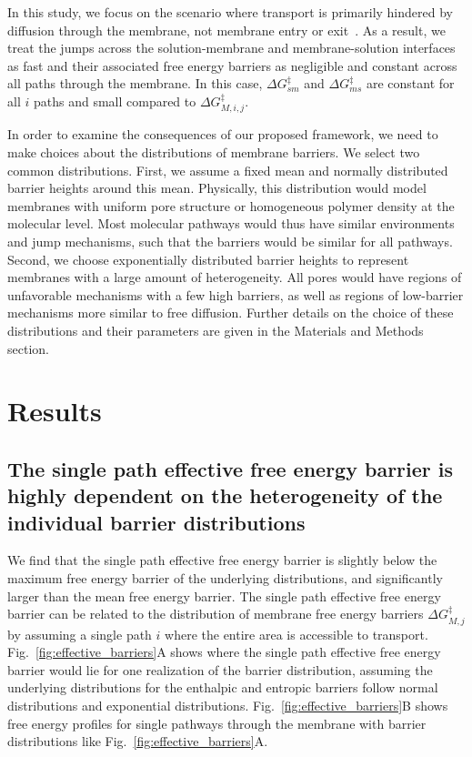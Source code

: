 \documentclass[12pt]{article}
\begin{document}
In this study, we focus on the scenario where transport is primarily hindered by diffusion through the membrane, not membrane entry or exit~\cite{zhou_intrapore_2020,song_molecular_2020}. As a result, we treat the jumps across the solution-membrane and membrane-solution interfaces as fast and their associated free energy barriers as negligible and constant across all paths through the membrane. In this case, $\Delta G_{sm}^{\ddagger}$ and $\Delta G_{ms}^{\ddagger}$ are constant for all $i$  paths and small compared to $\Delta G_{M,i,j}^{\ddagger}$. 

In order to examine the consequences of our proposed framework, we need to make choices about the distributions of membrane barriers. We select two common distributions. First, we assume a fixed mean and normally distributed barrier heights around this mean. Physically, this distribution would model membranes with uniform pore structure or homogeneous polymer density at the molecular level. Most molecular pathways would thus have similar environments and jump mechanisms, such that the barriers would be similar for all pathways. Second, we choose exponentially distributed barrier heights to represent membranes with a large amount of heterogeneity. All pores would have regions of unfavorable mechanisms with a few high barriers, as well as regions of low-barrier mechanisms more similar to free diffusion. Further details on the choice of these distributions and their parameters are given in the Materials and Methods section.

\section*{Results}
\subsection*{The single path effective free energy barrier is highly dependent on the heterogeneity of the individual barrier distributions}

We find that the single path effective free energy barrier is slightly below the maximum free energy barrier of the underlying distributions, and significantly larger than the mean free energy barrier. The single path effective free energy barrier can be related to the distribution of membrane free energy barriers $\Delta G_{M,j}^{\ddagger}$ by assuming a single path $i$ where the entire area is accessible to transport. Fig.~\ref{fig:effective_barriers}A shows where the single path effective free energy barrier would lie for one realization of the barrier distribution, assuming the underlying distributions for the enthalpic and entropic barriers follow normal distributions and exponential distributions. Fig.~\ref{fig:effective_barriers}B shows free energy profiles for single pathways through the membrane with barrier distributions like Fig.~\ref{fig:effective_barriers}A. 
\end{document}
